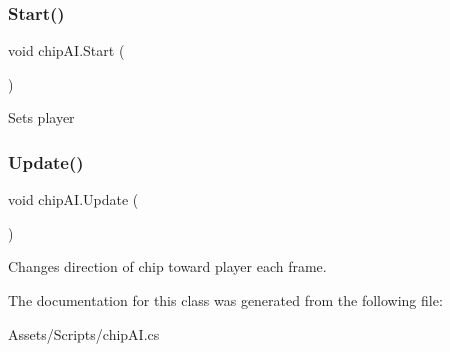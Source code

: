 \subsubsection{\texorpdfstring{Start()}{Start()}}
{\footnotesize\ttfamily void chip\+A\+I.\+Start (\begin{DoxyParamCaption}{ }\end{DoxyParamCaption})\hspace{0.3cm}{\ttfamily [inline]}}

Sets player \mbox{\label{classchip_a_i_a32e9caf3833a989c9b596bc9aa3bf0e9}} 
\subsubsection{\texorpdfstring{Update()}{Update()}}
{\footnotesize\ttfamily void chip\+A\+I.\+Update (\begin{DoxyParamCaption}{ }\end{DoxyParamCaption})\hspace{0.3cm}{\ttfamily [inline]}}

Changes direction of chip toward player each frame. 

The documentation for this class was generated from the following file\+:\begin{DoxyCompactItemize}
\item 
Assets/\+Scripts/chip\+A\+I.\+cs\end{DoxyCompactItemize}

